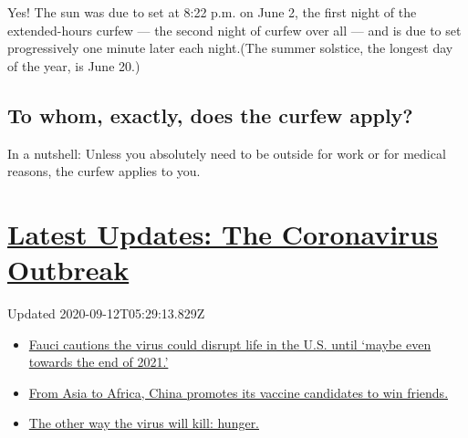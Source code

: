 Yes! The sun was due to set at 8:22 p.m. on June 2, the first night of
the extended-hours curfew --- the second night of curfew over all ---
and is due to set progressively one minute later each night.(The summer
solstice, the longest day of the year, is June 20.)

\hypertarget{to-whom-exactly-does-the-curfew-apply}{%
\subsection{To whom, exactly, does the curfew
apply?}\label{to-whom-exactly-does-the-curfew-apply}}

In a nutshell: Unless you absolutely need to be outside for work or for
medical reasons, the curfew applies to you.

\hypertarget{latest-updates-the-coronavirus-outbreak}{%
\section{\texorpdfstring{\href{https://www.nytimes3xbfgragh.onion/2020/09/11/world/covid-19-coronavirus.html?action=click\&pgtype=Article\&state=default\&region=MAIN_CONTENT_1\&context=storylines_live_updates}{Latest
Updates: The Coronavirus
Outbreak}}{Latest Updates: The Coronavirus Outbreak}}\label{latest-updates-the-coronavirus-outbreak}}

Updated 2020-09-12T05:29:13.829Z

\begin{itemize}
\tightlist
\item
  \href{https://www.nytimes3xbfgragh.onion/2020/09/11/world/covid-19-coronavirus.html?action=click\&pgtype=Article\&state=default\&region=MAIN_CONTENT_1\&context=storylines_live_updates\#link-dfb8a16}{Fauci
  cautions the virus could disrupt life in the U.S. until `maybe even
  towards the end of 2021.'}
\item
  \href{https://www.nytimes3xbfgragh.onion/2020/09/11/world/covid-19-coronavirus.html?action=click\&pgtype=Article\&state=default\&region=MAIN_CONTENT_1\&context=storylines_live_updates\#link-7104d154}{From
  Asia to Africa, China promotes its vaccine candidates to win friends.}
\item
  \href{https://www.nytimes3xbfgragh.onion/2020/09/11/world/covid-19-coronavirus.html?action=click\&pgtype=Article\&state=default\&region=MAIN_CONTENT_1\&context=storylines_live_updates\#link-393ad215}{The
  other way the virus will kill: hunger.}
\end{itemize}

